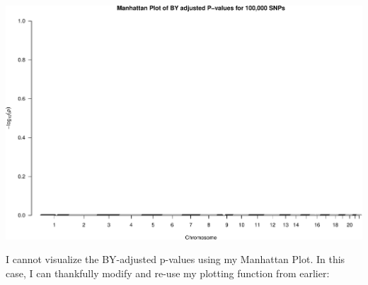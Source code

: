 \documentclass[
  12pt,
]{article}
\begin{document}
\includegraphics{Arkesh_Das_CMSE_410_Semester_Project_files/figure-latex/Benjamini-Yekutieli test-1.pdf}

I cannot visualize the BY-adjusted p-values using my Manhattan Plot. In
this case, I can thankfully modify and re-use my plotting function from
earlier:
\end{document}
